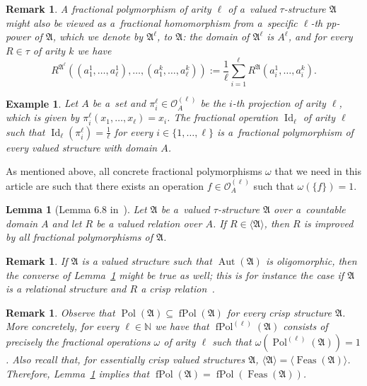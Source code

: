 \documentclass[preprint,12pt]{elsarticle}
\newcommand{\N}{\mathbb N}
\newcommand{\bA}{{\mathfrak A}}
\newcommand{\checked}[1]{#1}
\DeclareMathOperator{\Aut}{Aut}
\DeclareMathOperator{\fPol}{fPol}
\DeclareMathOperator{\Pol}{Pol}
\DeclareMathOperator{\Id}{Id}
\DeclareMathOperator{\Feas}{Feas}
\newtheorem{lemma}[theorem]{Lemma}
\newtheorem{example}[theorem]{Example}
\newtheorem{remark}[theorem]{Remark}
\begin{document}
\begin{remark}\label{rem:frac-pol-frac-hom}
A fractional polymorphism of arity $\ell$ of a~valued $\tau$-structure $\bA$ might also be viewed as a~fractional homomorphism from a~specific $\ell$-th pp-power of $\bA$, which we denote by $\bA^{\ell}$, to $\bA$: 
the domain of $\bA^{\ell}$ is $A^{\ell}$,
and for every $R \in \tau$ of arity $k$ we have
\[R^{\bA^{\ell}}((a^1_1,\dots,a^1_{\ell}),\dots,(a^k_1,\dots,a^k_{\ell})) 
:= \frac{1}{\ell} \sum_{i=1}^\ell R^{\bA}(a^1_i,\dots,a^{k}_i).\]
\end{remark} 


\begin{example}\label{expl:id}
Let $A$ be a~set and $\pi^\ell_i \in {\mathscr O}^{(\ell)}_A$ be the $i$-th projection of arity $\ell$, which is given by $\pi^\ell_i(x_1,\dots,x_\ell) = x_i$.
The fractional operation $\Id_\ell$ of arity $\ell$ such that $\Id_\ell(\pi^{\ell}_{i}) = \frac{1}{\ell}$ 
for every $i \in \{1,\dots,\ell\}$ is a~fractional polymorphism of every valued structure with domain $A$. 
\end{example}

As mentioned above, all concrete fractional polymorphisms $\omega$ that we need in this article are such that there exists an operation $f \in \mathscr{O}_A^{(\ell)}$ such that $\omega(\{f\})=1$.

\begin{lemma}[Lemma 6.8 in~\cite{Resilience-VCSPs}]\label{lem:easy-Imp-fPol}
Let $\bA$ be a~valued $\tau$-structure $\bA$ 
over a~countable domain $A$
and let $R$ be a valued relation over $A$. If 
$R \in \langle \bA \rangle$,
then $R$ is improved by all fractional polymorphisms of $\bA$.
\end{lemma}

\begin{remark}\label{rem:oligo}
    If $\bA$ is a valued structure such that $\Aut(\bA)$ is oligomorphic, then the converse of Lemma~\ref{lem:easy-Imp-fPol} might be true as well; this is for instance the case if $\bA$ is a \checked{relational} structure and $R$ a \checked{crisp} relation~\cite{BodirskyNesetrilJLC}.
\end{remark}

\begin{remark} \label{rem:ess-crisp-fPol}
Observe that $\Pol(\bA) \subseteq \fPol(\bA)$ for every crisp structure $\bA$. 
More concretely, for every $\ell \in \N$ we have that $\fPol^{(\ell)}(\bA)$ consists of precisely the fractional operations $\omega$ of arity $\ell$ such that $\omega(\Pol^{(\ell)}(\bA))=1$.
Also recall that, for essentially crisp valued structures $\bA$, $\langle \bA \rangle = \langle \Feas(\bA) \rangle$. 
Therefore,  Lemma~\ref{lem:easy-Imp-fPol} implies that $\fPol(\bA)=\fPol(\Feas(\bA))$.
\end{remark}
\end{document}
